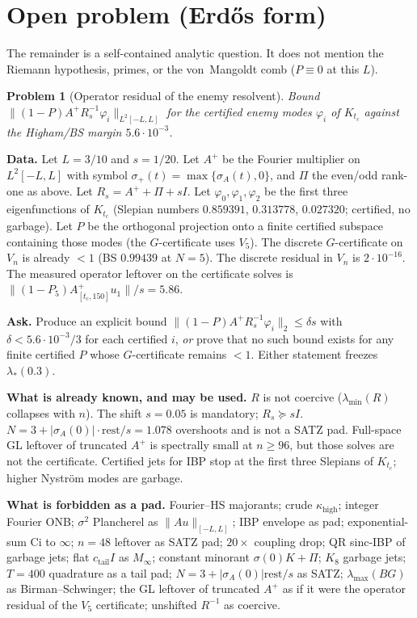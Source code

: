 \documentclass[11pt]{article}
\newtheorem{problem}{Problem}
\theoremstyle{remark}
\begin{document}
\section{Open problem (Erd\H{o}s form)}

The remainder is a self-contained analytic
question.  It does not mention the Riemann
hypothesis, primes, or the von~Mangoldt comb
($P\equiv0$ at this $L$).

\begin{problem}[Operator residual of the enemy resolvent]
\label{pr:opres}
Bound $\|(1-P)A^+R_s^{-1}\varphi_i\|_{L^2[-L,L]}$
for the certified enemy modes $\varphi_i$ of
$K_{t_c}$ against the Higham/BS margin
$5.6\cdot10^{-3}$.
\end{problem}

\noindent\textbf{Data.}
Let $L=3/10$ and $s=1/20$.
Let $A^+$ be the Fourier multiplier on
$L^2[-L,L]$ with symbol
$\sigma_+(t)=\max\{\sigma_A(t),0\}$,
and $\Pi$ the even/odd rank-one as above.
Let $R_s=A^++\Pi+sI$.
Let $\varphi_0,\varphi_1,\varphi_2$ be the
first three eigenfunctions of $K_{t_c}$
(Slepian numbers
$0.859391$, $0.313778$, $0.027320$;
certified, no garbage).
Let $P$ be the orthogonal projection onto
a finite certified subspace containing
those modes (the $G$-certificate uses $V_5$).
The discrete $G$-certificate on $V_n$ is
already $<1$ (BS $0.99439$ at $N=5$).
The discrete residual in $V_n$ is
$2\cdot10^{-16}$.
The measured operator leftover on the
certificate solves is
$\|(1-P_5)A^+_{[t_c,150]}u_1\|/s=5.86$.

\noindent\textbf{Ask.}
Produce an explicit bound
$\|(1-P)A^+R_s^{-1}\varphi_i\|_2\le\delta s$
with $\delta<5.6\cdot10^{-3}/3$
for each certified $i$,
\emph{or} prove that no such bound exists
for any finite certified $P$ whose
$G$-certificate remains $<1$.
Either statement freezes $\lambda_*(0.3)$.

\noindent\textbf{What is already known, and may be used.}
$R$ is not coercive
($\lambda_{\min}(R)$ collapses with $n$).
The shift $s=0.05$ is mandatory;
$R_s\succeq sI$.
$N=3+|\sigma_A(0)|\cdot\mathrm{rest}/s=1.078$
overshoots and is not a SATZ pad.
Full-space GL leftover of truncated $A^+$
is spectrally small at $n\ge96$, but
those solves are not the certificate.
Certified jets for IBP stop at the first
three Slepians of $K_{t_c}$;
higher Nystr\"om modes are garbage.

\noindent\textbf{What is forbidden as a pad.}
Fourier--HS majorants;
crude $\kappa_{\mathrm{high}}$;
integer Fourier ONB;
$\sigma^2$ Plancherel as $\|Au\|_{[-L,L]}$;
IBP envelope as pad;
exponential-sum Ci to $\infty$;
$n=48$ leftover as SATZ pad;
$20\times$ coupling drop;
QR sinc-IBP of garbage jets;
flat $c_{\mathrm{tail}}I$ as $M_\infty$;
constant minorant $\sigma(0)K+\Pi$;
$K_8$ garbage jets;
$T=400$ quadrature as a tail pad;
$N=3+|\sigma_A(0)|\mathrm{rest}/s$ as SATZ;
$\lambda_{\max}(BG)$ as Birman--Schwinger;
the GL leftover of truncated $A^+$ as if it
were the operator residual of the
$V_5$ certificate;
unshifted $R^{-1}$ as coercive.
\end{document}
